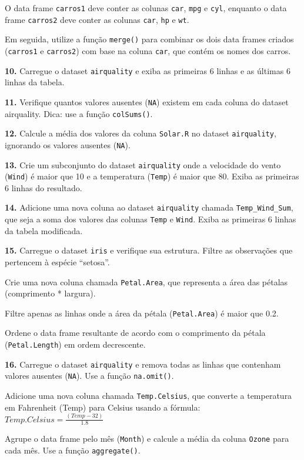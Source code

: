 \documentclass[
]{book}
\begin{document}
O data frame \texttt{carros1} deve conter as colunas \texttt{car}, \texttt{mpg} e \texttt{cyl}, enquanto o data frame \texttt{carros2} deve conter as colunas \texttt{car}, \texttt{hp} e \texttt{wt}.

Em seguida, utilize a função \texttt{merge()} para combinar os dois data frames criados (\texttt{carros1} e \texttt{carros2}) com base na coluna \texttt{car}, que contém os nomes dos carros.

\textbf{10.} Carregue o dataset \texttt{airquality} e exiba as primeiras 6 linhas e
as últimas 6 linhas da tabela.

\textbf{11.} Verifique quantos valores ausentes (\texttt{NA}) existem em cada coluna
do dataset airquality. Dica: use a função \texttt{colSums()}.

\textbf{12.} Calcule a média dos valores da coluna \texttt{Solar.R} no dataset
\texttt{airquality}, ignorando os valores ausentes (\texttt{NA}).

\textbf{13.} Crie um subconjunto do dataset \texttt{airquality} onde a velocidade do
vento (\texttt{Wind}) é maior que 10 e a temperatura (\texttt{Temp}) é maior que 80.
Exiba as primeiras 6 linhas do resultado.

\textbf{14.} Adicione uma nova coluna ao dataset \texttt{airquality} chamada
\texttt{Temp\_Wind\_Sum}, que seja a soma dos valores das colunas \texttt{Temp} e
\texttt{Wind}. Exiba as primeiras 6 linhas da tabela modificada.

\textbf{15.} Carregue o dataset \texttt{iris} e verifique sua estrutura. Filtre as observações que pertencem à espécie ``setosa''.

Crie uma nova coluna chamada \texttt{Petal.Area}, que representa a área das pétalas (comprimento * largura).

Filtre apenas as linhas onde a área da pétala (\texttt{Petal.Area}) é maior que 0.2.

Ordene o data frame resultante de acordo com o comprimento da pétala (\texttt{Petal.Length}) em ordem decrescente.

\textbf{16.} Carregue o dataset \texttt{airquality} e remova todas as linhas que contenham valores ausentes (\texttt{NA}). Use a função \texttt{na.omit()}.

Adicione uma nova coluna chamada \texttt{Temp.Celsius}, que converte a temperatura em Fahrenheit (Temp) para Celsius usando a fórmula: \(Temp.Celsius = \frac{(Temp - 32)}{1.8}\)

Agrupe o data frame pelo mês (\texttt{Month}) e calcule a média da coluna \texttt{Ozone} para cada mês. Use a função \texttt{aggregate()}.
\end{document}
